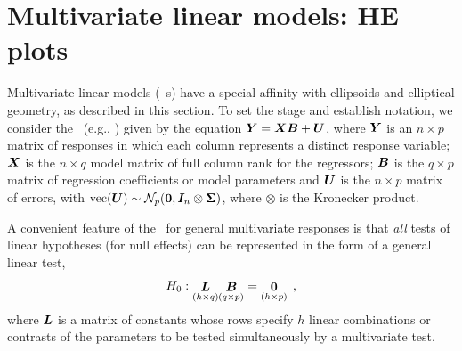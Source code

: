 
\section{Multivariate linear models: HE plots}\label{sec:mlm}
Multivariate linear models (\MLM\ s) have a special affinity with ellipsoids and elliptical geometry,
as described in this section.  To set the stage and establish notation, we consider
the \MLM\ (e.g., \citet{Timm:75}) given by
the equation $\bm{Y}=\bm{XB}+\bm{U}$, where $\bm{Y}$ is an $%
n\times p$ matrix of responses in which each column represents a distinct
response variable; $\bm{X}$ is the  $n\times q$ model matrix of full
column rank for the regressors; $\bm{B}$ is the $q \times p$ matrix
of regression coefficients or model parameters and $\bm{U}$ is the $n \times p$
matrix of errors,
with $\textrm{vec}(\bm{U}) \sim \mathcal{N}_p ( \bm{0}, \bm{I}_n \otimes \bm{\Sigma} )$,
where $\otimes$ is the Kronecker product.

A convenient feature of the \MLM\ for general multivariate responses is that
\emph{all} tests of linear hypotheses (for null effects) can be represented in the form of a general
linear test,
\begin{equation}\label{eq:mglt}
H_0 : \mathord{\mathop{\bm{L}}\limits_{(h \times q)}}
\mathord{\mathop{\bm{B}}\limits_{(q \times p)}} =
\mathord{\mathop{\bm{0}}\limits_{(h \times p)}}
\:\: ,
\end{equation}
where $\bm{L}$ is a matrix of constants whose rows specify
$h$ linear combinations or contrasts
of the parameters to be tested simultaneously
by a multivariate test. 

